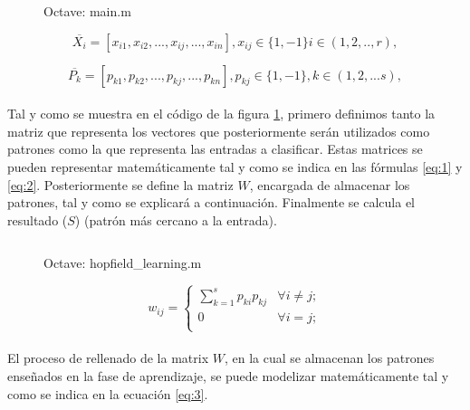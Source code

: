 \documentclass[10pt, a4paper,spanish]{article}
\begin{document}
		\begin{figure}[htpb!]
			\centering
			\inputminted{octave}{../src/main.m}
			\caption{Octave: main.m}
			\label{code:main}
		\end{figure}

		\begin{equation} \label{eq:1}
			\overline{X_{i}} = [x_{i1}, x_{i2}, ..., x_{ij}, ..., x_{in}], x_{ij} \in \{1,-1\} i \in (1,2,.., r),
		\end{equation}

		\begin{equation} \label{eq:2}
			\overline{P_{k}} = [p_{k1}, p_{k2}, ..., p_{kj}, ..., p_{kn}], p_{kj} \in \{1,-1\}, k \in (1,2,...s),
		\end{equation}

		\paragraph{}
		Tal y como se muestra en el código de la figura \ref{code:main}, primero definimos tanto la matriz que representa los  vectores que posteriormente serán utilizados como patrones como la que representa las entradas a clasificar. Estas matrices se pueden representar matemáticamente tal y como se indica en las fórmulas \ref{eq:1} y \ref{eq:2}.  Posteriormente se define la matriz $W$, encargada de almacenar los patrones, tal y como se explicará a continuación. Finalmente se calcula el resultado ($S$) (patrón más cercano a la entrada).

		\begin{figure}[htpb!]
			\centering
			\inputminted{octave}{../src/hopfield_learning.m}
			\caption{Octave: hopfield\_learning.m}
			\label{code:learning}
		\end{figure}

		\begin{equation} \label{eq:3}
			w_{ij} =
			\begin{cases}
				\sum_{k=1}^{s} p_{ki}p_{kj} 	& \forall i \neq j; 	\\
				0															& \forall i = j; 		\\
			\end{cases}
		\end{equation}

		\paragraph{}
		El proceso de rellenado de la matrix $W$, en la cual se almacenan los patrones enseñados en la fase de aprendizaje, se puede modelizar matemáticamente tal y como se indica en la ecuación \ref{eq:3}.
\end{document}
